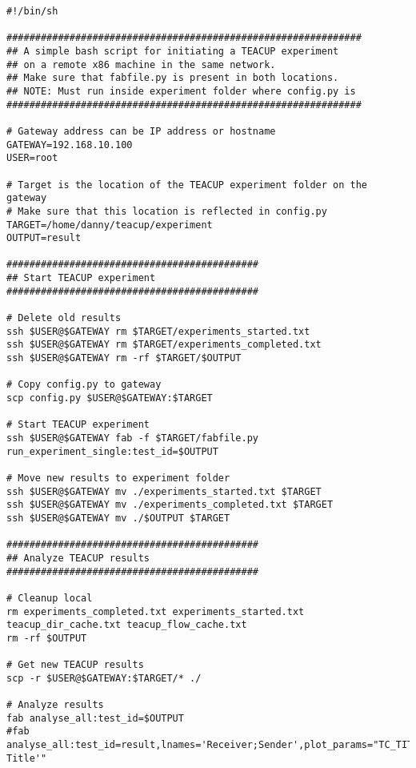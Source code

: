\begin{verbatim}
#!/bin/sh

##############################################################
## A simple bash script for initiating a TEACUP experiment
## on a remote x86 machine in the same network.
## Make sure that fabfile.py is present in both locations.
## NOTE: Must run inside experiment folder where config.py is
##############################################################

# Gateway address can be IP address or hostname
GATEWAY=192.168.10.100
USER=root

# Target is the location of the TEACUP experiment folder on the gateway
# Make sure that this location is reflected in config.py
TARGET=/home/danny/teacup/experiment
OUTPUT=result

############################################
## Start TEACUP experiment
############################################

# Delete old results
ssh $USER@$GATEWAY rm $TARGET/experiments_started.txt
ssh $USER@$GATEWAY rm $TARGET/experiments_completed.txt
ssh $USER@$GATEWAY rm -rf $TARGET/$OUTPUT

# Copy config.py to gateway
scp config.py $USER@$GATEWAY:$TARGET

# Start TEACUP experiment
ssh $USER@$GATEWAY fab -f $TARGET/fabfile.py run_experiment_single:test_id=$OUTPUT

# Move new results to experiment folder
ssh $USER@$GATEWAY mv ./experiments_started.txt $TARGET
ssh $USER@$GATEWAY mv ./experiments_completed.txt $TARGET
ssh $USER@$GATEWAY mv ./$OUTPUT $TARGET

############################################
## Analyze TEACUP results
############################################

# Cleanup local
rm experiments_completed.txt experiments_started.txt teacup_dir_cache.txt teacup_flow_cache.txt
rm -rf $OUTPUT

# Get new TEACUP results
scp -r $USER@$GATEWAY:$TARGET/* ./

# Analyze results
fab analyse_all:test_id=$OUTPUT
#fab analyse_all:test_id=result,lnames='Receiver;Sender',plot_params="TC_TITLE\='Plot Title'"
\end{verbatim}
